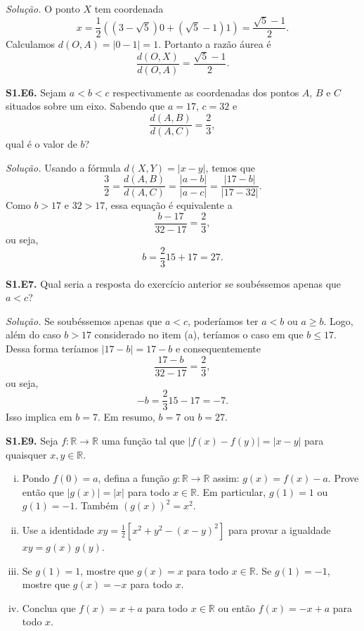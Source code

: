 \documentclass[a4paper,11pt]{article}
\newcommand{\R}{\mathbb{R}}
\begin{document}
\vspace{\baselineskip}

\emph{Solução.}
O ponto $X$ tem coordenada
\[
  x = \frac{1}{2} ( (3-\sqrt{5}) 0 + (\sqrt{5}-1) 1 ) = \frac{\sqrt{5}-1}{2}.
\]
Calculamos $d(O,A) = |0-1| = 1$.
Portanto a razão áurea é
\[
  \frac{d(O,X)}{d(O,A)} = \frac{\sqrt{5}-1}{2}.
\]

\vspace{\baselineskip}

\textbf{S1.E6.}
Sejam $a < b < c$ respectivamente as coordenadas dos pontos $A$, $B$ e $C$ situados sobre um eixo.
Sabendo que $a = 17$, $c = 32$ e
\[
  \frac{d(A,B)}{d(A,C)} = \frac{2}{3},
\]
qual é o valor de $b$?

\vspace{\baselineskip}

\emph{Solução.}
Usando a fórmula $d(X,Y) = |x-y|$, temos que
\[
  \frac{3}{2} = \frac{d(A,B)}{d(A,C)} = \frac{|a-b|}{|a-c|} = \frac{|17-b|}{|17-32|}.
\]
Como $b > 17$ e $32 > 17$, essa equação é equivalente a
\[
  \frac{b-17}{32-17} = \frac{2}{3},
\]
ou seja,
\[
  b = \frac{2}{3} 15 + 17 = 27.
\]

\vspace{\baselineskip}

\textbf{S1.E7.}
Qual seria a resposta do exercício anterior se soubéssemos apenas que $a < c$?

\vspace{\baselineskip}

\emph{Solução.}
Se soubéssemos apenas que $a < c$, poderíamos ter $a < b$ ou $a \ge b$.
Logo, além do caso $b > 17$ considerado no item (a), teríamos o caso em que $b \le 17$.
Dessa forma teríamos $|17-b| = 17-b$ e consequentemente
\[
  \frac{17-b}{32-17} = \frac{2}{3},
\]
ou seja,
\[
  -b = \frac{2}{3} 15 - 17 = -7.
\]
Isso implica em $b = 7$.
Em resumo, $b = 7$ ou $b = 27$.

\vspace{\baselineskip}

\textbf{S1.E9.}
Seja $f : \R \to \R$ uma função tal que $|f(x)-f(y)| = |x-y|$ para quaisquer $x,y \in \R$.
\begin{enumerate}[(i)]
  \item
    Pondo $f(0) = a$, defina a função $g : \R \to \R$ assim: $g(x) = f(x) - a$.
    Prove então que $|g(x)| = |x|$ para todo $x \in \R$.
    Em particular, $g(1) = 1$ ou $g(1) = -1$.
    Também $(g(x))^2 = x^2$.
  \item
    Use a identidade $xy = \frac{1}{2}[ x^2 + y^2 - (x-y)^2 ]$ para provar a igualdade $xy = g(x)\,g(y)$.
  \item
    Se $g(1) = 1$, mostre que $g(x) = x$ para todo $x \in \R$.
    Se $g(1) = -1$, mostre que $g(x) = -x$ para todo $x$.
  \item
    Conclua que $f(x) = x + a$ para todo $x \in \R$ ou então $f(x) = -x + a$ para todo $x$.
\end{enumerate}
\end{document}
